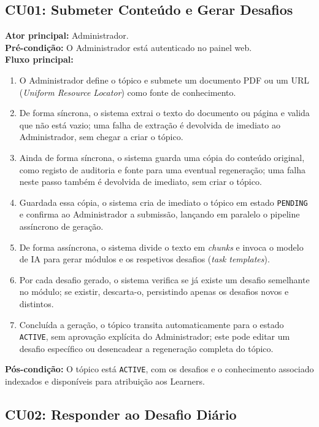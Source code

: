 \subsection{CU01: Submeter Conteúdo e Gerar Desafios}

\textbf{Ator principal:} Administrador.\\
\textbf{Pré-condição:} O Administrador está autenticado no painel web.\\
\textbf{Fluxo principal:}
\begin{enumerate}
    \item O Administrador define o tópico e submete um documento PDF ou um URL (\textit{Uniform Resource Locator}) como fonte de conhecimento.
    \item De forma síncrona, o sistema extrai o texto do documento ou página e valida que não está vazio; uma falha de extração é devolvida de imediato ao Administrador, sem chegar a criar o tópico.
    \item Ainda de forma síncrona, o sistema guarda uma cópia do conteúdo original, como registo de auditoria e fonte para uma eventual regeneração; uma falha neste passo também é devolvida de imediato, sem criar o tópico.
    \item Guardada essa cópia, o sistema cria de imediato o tópico em estado \texttt{PENDING} e confirma ao Administrador a submissão, lançando em paralelo o pipeline assíncrono de geração.
    \item De forma assíncrona, o sistema divide o texto em \textit{chunks} e invoca o modelo de IA para gerar módulos e os respetivos desafios (\textit{task templates}).
    \item Por cada desafio gerado, o sistema verifica se já existe um desafio semelhante no módulo; se existir, descarta-o, persistindo apenas os desafios novos e distintos.
    \item Concluída a geração, o tópico transita automaticamente para o estado \texttt{ACTIVE}, sem aprovação explícita do Administrador; este pode editar um desafio específico ou desencadear a regeneração completa do tópico.
\end{enumerate}
\textbf{Pós-condição:} O tópico está \texttt{ACTIVE}, com os desafios e o conhecimento associado indexados e disponíveis para atribuição aos Learners.

\subsection{CU02: Responder ao Desafio Diário}

